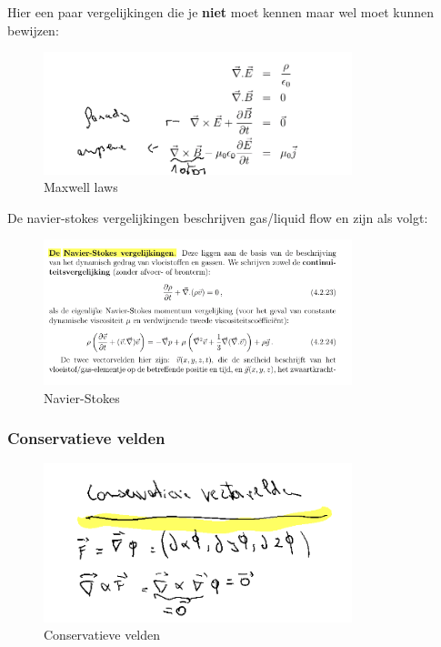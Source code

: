 \documentclass[a4paper]{report}
\begin{document}
Hier een paar vergelijkingen die je \textbf{niet} moet kennen maar wel moet kunnen bewijzen:


\begin{figure}[H]
	\centering
	\includegraphics[width=0.8\textwidth]{assets/maxwell.png}
	\caption{Maxwell laws}
	\label{fig:maxwell}
\end{figure}

De navier-stokes vergelijkingen beschrijven gas/liquid flow en zijn als volgt:

\begin{figure}[H]
	\centering
	\includegraphics[width=0.8\textwidth]{assets/navier_stokes.png}
	\caption{Navier-Stokes}
	\label{fig:navier_stokes}
\end{figure}

\subsubsection{Conservatieve velden}

\begin{figure}[H]
	\centering
	\includegraphics[width=0.8\textwidth]{assets/conservatieve_velden.png}
	\caption{Conservatieve velden}
	\label{fig:conservatieve_velden}
\end{figure}
\end{document}
